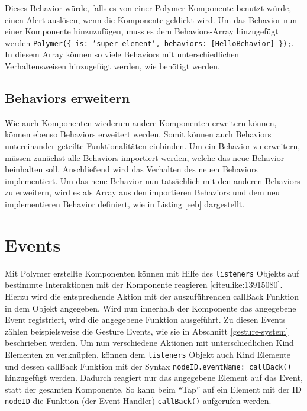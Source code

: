 

Dieses Behavior würde, falls es von einer Polymer Komponente benutzt würde, einen Alert auslösen, wenn die Komponente geklickt wird. Um das Behavior nun einer Komponente hinzuzufügen, muss es dem Behaviors-Array hinzugefügt werden \texttt{Polymer(\{\ is:\ 'super-element',\ behaviors:\ {[}HelloBehavior{]}\ \});}. In diesem Array können so viele Behaviors mit unterschiedlichen Verhaltensweisen hinzugefügt werden, wie benötigt werden.


\subsection{Behaviors erweitern}\label{behaviors-erweitern}

Wie auch Komponenten wiederum andere Komponenten erweitern können, können ebenso Behaviors erweitert werden. Somit können auch Behaviors untereinander geteilte Funktionalitäten einbinden. Um ein Behavior zu erweitern, müssen zunächst alle Behaviors importiert werden, welche das neue Behavior beinhalten soll. Anschließend wird das Verhalten des neuen Behaviors implementiert. Um das neue Behavior nun tatsächlich mit den anderen Behaviors zu erweitern, wird es als Array aus den importieren Behaviors und dem neu implementieren Behavior definiert, wie in Listing \ref{eeb} dargestellt.




\section{Events}\label{events}

Mit Polymer erstellte Komponenten können mit Hilfe des \texttt{listeners} Objekts auf bestimmte Interaktionen mit der Komponente reagieren {[}citeulike:13915080{]}. Hierzu wird die entsprechende Aktion mit der auszuführenden callBack Funktion in dem Objekt angegeben. Wird nun innerhalb der Komponente das angegebene Event registriert, wird die angegebene Funktion ausgeführt. Zu diesen Events zählen beispielsweise die Gesture Events, wie sie in Abschnitt \ref{gesture-system} beschrieben werden. Um nun verschiedene Aktionen mit unterschiedlichen Kind Elementen zu verknüpfen, können dem \texttt{listeners} Objekt auch Kind Elemente und dessen callBack Funktion mit der Syntax \texttt{nodeID.eventName:\ callBack()} hinzugefügt werden. Dadurch reagiert nur das angegebene Element auf das Event, statt der gesamten Komponente. So kann beim ``Tap'' auf ein Element mit der ID \texttt{nodeID} die Funktion (der Event Handler) \texttt{callBack()} aufgerufen werden.


